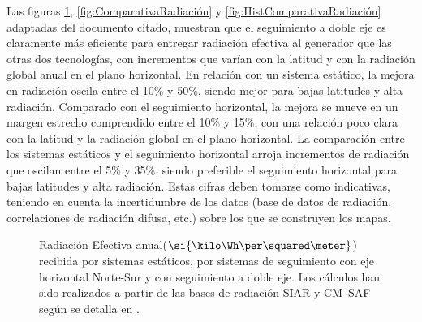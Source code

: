 Las figuras \ref{fig:MapasRadiacion}, \ref{fig:ComparativaRadiación} y
\ref{fig:HistComparativaRadiación} adaptadas del documento citado,
muestran que el seguimiento a doble eje es claramente más eficiente
para entregar radiación efectiva al generador que las otras dos
tecnologías, con incrementos que varían con la latitud y con la
radiación global anual en el plano horizontal. En relación con un
sistema estático, la mejora en radiación oscila entre el 10\% y 50\%,
siendo mejor para bajas latitudes y alta radiación. Comparado con el
seguimiento horizontal, la mejora se mueve en un margen estrecho
comprendido entre el 10\% y 15\%, con una relación poco clara con la
latitud y la radiación global en el plano horizontal.  La comparación
entre los sistemas estáticos y el seguimiento horizontal arroja
incrementos de radiación que oscilan entre el 5\% y 35\%, siendo
preferible el seguimiento horizontal para bajas latitudes y alta
radiación. Estas cifras deben tomarse como indicativas, teniendo en
cuenta la incertidumbre de los datos (base de datos de radiación,
correlaciones de radiación difusa, etc.) sobre los que se construyen
los mapas.

%
\begin{figure}
  \begin{centering}
  \end{centering}

\begin{centering}
  \par\end{centering}

\begin{centering}
  \par\end{centering}
\caption[Mapas de Radiación Efectiva]{Radiación Efectiva
  anual($\si{\kilo\Wh\per\squared\meter}$) recibida por sistemas
  estáticos, por sistemas de seguimiento con eje horizontal Norte-Sur
  y con seguimiento a doble eje. Los cálculos han sido realizados a
  partir de las bases de radiación SIAR \cite{SIAR2011} y CM~SAF
  \cite{Posselt.Muller.ea2011} según se detalla en
  \cite{Antonanzas-Torres.Canizares.ea2013}.}
\label{fig:MapasRadiacion}
\end{figure}


